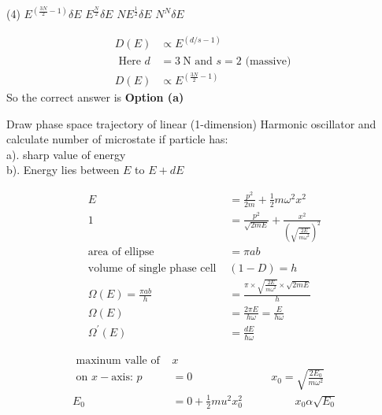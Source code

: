  \begin{tasks}(4)
	\task[\textbf{a.}]$E^{\left(\frac{3 N}{2}-1\right)} \delta E$
	\task[\textbf{b.}]$E^{\frac{N}{2}} \delta E$
	\task[\textbf{c.}]$N E^{\frac{1}{2}} \delta E$
	\task[\textbf{d.}]$N^{N} \delta E$ 
\end{tasks}
\begin{answer}
	\begin{align*}
	D(E) &\propto E^{(d / s-1)}\\
	\text { Here } d&=3 \mathrm{~N} \text { and } s=2 \text { (massive) }\\
	D(E) &\propto E^{\left(\frac{3 N}{2}-1\right)}
	\end{align*}
		So the correct answer is \textbf{Option (a)}
\end{answer}
\begin{exercise}
 Draw phase space trajectory of linear (1-dimension) Harmonic oscillator and calculate number of microstate if particle has:\\
	a). sharp value of energy\\
	b). Energy lies between $E$ to $E+d E$
\end{exercise}
\begin{answer}
	\begin{align*}
	E&=\frac{p^{2}}{2 m}+\frac{1}{2} m \omega^2 x^{2}\\
	1&=\frac{p^{2}}{\sqrt{2 m E}}+\frac{x^{2}}{\left(\sqrt{\frac{2 E}{m \omega^2}}\right)^{2}}\\
	\text{area of ellipse }&=\pi a b\\
	\text{volume of single phase cell }&(1-D)=h\\
	\Omega(E)=\frac{\pi a b}{h}&=\frac{\pi \times \sqrt{\frac{2 E}{m \omega^2}}  \times \sqrt{2 m E}}{h}\\
	\Omega(E)&=\frac{2 \pi E}{h \omega}=\frac{E}{h \omega}\\
	\Omega^{\prime}(E)&=\frac{d E}{\hbar \omega}
	\end{align*}
\end{answer}
\begin{note}
	\begin{align*}
	\text{	maxinum valle of }&x \\
\text{	on }x-\text{axis: }p&=0 \hspace{3cm}x_{0}=\sqrt{\frac{2 E_{0}}{m \omega^{2}}}\\
	E_{0}&=0+\frac{1}{2} m u^{2} x_{0}^{2}\hspace{2cm}x_{0} \alpha \sqrt{E_{0}}\\
	\end{align*}
\end{note}






